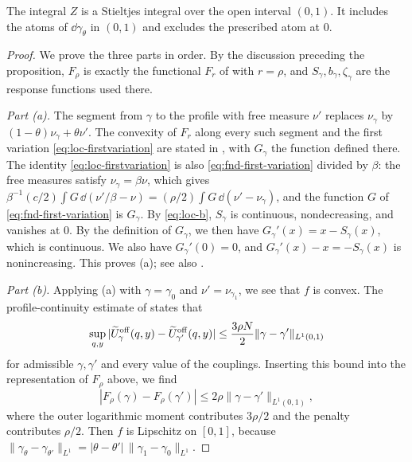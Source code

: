 The integral $Z$ is a Stieltjes integral over the open interval $(0,1)$. It
includes the atoms of $\dd\gamma_\theta$ in $(0,1)$ and excludes the
prescribed atom at $0$.

\begin{proof}
We prove the three parts in order. By the discussion preceding the
proposition, $F_\rho$ is exactly the functional $F_r$ of \cite[Section~7.4]{AL}
with $r=\rho$, and $S_\gamma,b_\gamma,
\zeta_\gamma$ are the response functions used there.

\emph{Part (a).} The segment from $\gamma$ to the profile with free measure
$\nu'$ replaces $\nu_\gamma$ by $(1-\theta)\nu_\gamma+\theta\nu'$. The
convexity of $F_r$ along every such segment and the first variation
\eqref{eq:loc-firstvariation} are stated in \cite[Section~7.4, (7.22)]{AL},
with $G_\gamma$ the function defined there. The identity
\eqref{eq:loc-firstvariation} is also \eqref{eq:fnd-first-variation} divided
by $\beta$: the free measures satisfy $\nu_\gamma=\beta\nu$, which gives
$\beta^{-1}(c/2)\int G\,\dd(\nu'/\beta-\nu)=(\rho/2)\int
G\,\dd(\nu'-\nu_\gamma)$, and the function $G$ of
\eqref{eq:fnd-first-variation} is $G_\gamma$. By \eqref{eq:loc-b},
$S_\gamma$ is continuous, nondecreasing, and vanishes at $0$. By the
definition of $G_\gamma$, we then have $G_\gamma'(x)=x-S_\gamma(x)$, which is
continuous. We also have $G_\gamma'(0)=0$, and $G_\gamma'(x)-x=-S_\gamma(x)$ is
nonincreasing. This
proves (a); see also \cite[(7.23)]{AL}.

\emph{Part (b).} Applying (a) with $\gamma=\gamma_0$ and $\nu'=\nu_{\gamma_1}$, we see
that $f$ is convex. The profile-continuity estimate
of \cite[Section~7.4]{AL} states that
\[
 \sup_{q,y}|\widetilde U^{\rm off}_\gamma(q,y)-\widetilde U^{\rm off}_{\gamma'}(q,y)|
 \le\frac{3\rho N}2\|\gamma-\gamma'\|_{L^1(0,1)}
\]
for admissible $\gamma,\gamma'$ and every value of the couplings. Inserting
this bound into the representation of $F_\rho$ above, we find
\[
 |F_\rho(\gamma)-F_\rho(\gamma')|\le2\rho\|\gamma-\gamma'\|_{L^1(0,1)},
\]
where the outer logarithmic moment contributes $3\rho/2$ and the penalty
contributes $\rho/2$. Then $f$ is Lipschitz on $[0,1]$, because
$\|\gamma_\theta-\gamma_{\theta'}\|_{L^1}=|\theta-\theta'|\,\|\gamma_1-\gamma_0\|_{L^1}$.


\end{proof}
